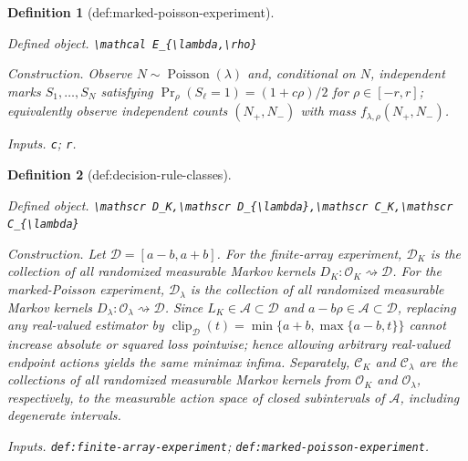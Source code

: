 \documentclass{article}
\newtheorem{definition}{Definition}
\begin{document}
\begin{definition}[def:marked-poisson-experiment]\label{def:marked-poisson-experiment}
\par\smallskip\noindent\emph{Defined object.} \texttt{\textbackslash{}\allowbreak{}mathcal E\_\allowbreak{}\{\textbackslash{}\allowbreak{}lambda,\allowbreak{}\textbackslash{}\allowbreak{}rho\}\allowbreak{}}
\par\smallskip\noindent\emph{Construction.} Observe \(N\sim\operatorname{Poisson}(\lambda)\) and, conditional on \(N\), independent marks \(S_1,\ldots,S_N\) satisfying \(\Pr_\rho(S_\ell=1)=(1+c\rho)/2\) for \(\rho\in[-r,r]\); equivalently observe independent counts \((N_+,N_-)\) with mass \(f_{\lambda,\rho}(N_+,N_-)\).
\par\smallskip\noindent\emph{Inputs.} \texttt{c}; \texttt{r}.
\end{definition}

\begin{definition}[def:decision-rule-classes]\label{def:decision-rule-classes}
\par\smallskip\noindent\emph{Defined object.} \texttt{\textbackslash{}\allowbreak{}mathscr D\_\allowbreak{}K,\allowbreak{}\textbackslash{}\allowbreak{}mathscr D\_\allowbreak{}\{\textbackslash{}\allowbreak{}lambda\}\allowbreak{},\allowbreak{}\textbackslash{}\allowbreak{}mathscr C\_\allowbreak{}K,\allowbreak{}\textbackslash{}\allowbreak{}mathscr C\_\allowbreak{}\{\textbackslash{}\allowbreak{}lambda\}\allowbreak{}}
\par\smallskip\noindent\emph{Construction.} Let \(\mathcal D=[a-b,a+b]\). For the finite-array experiment, \(\mathscr D_K\) is the collection of all randomized measurable Markov kernels \(D_K:\mathcal O_K\rightsquigarrow\mathcal D\). For the marked-Poisson experiment, \(\mathscr D_{\lambda}\) is the collection of all randomized measurable Markov kernels \(D_{\lambda}:\mathcal O_{\lambda}\rightsquigarrow\mathcal D\). Since \(L_K\in\mathcal A\subset\mathcal D\) and \(a-b\rho\in\mathcal A\subset\mathcal D\), replacing any real-valued estimator by \(\operatorname{clip}_{\mathcal D}(t)=\min\{a+b,\max\{a-b,t\}\}\) cannot increase absolute or squared loss pointwise; hence allowing arbitrary real-valued endpoint actions yields the same minimax infima. Separately, \(\mathscr C_K\) and \(\mathscr C_{\lambda}\) are the collections of all randomized measurable Markov kernels from \(\mathcal O_K\) and \(\mathcal O_{\lambda}\), respectively, to the measurable action space of closed subintervals of \(\mathcal A\), including degenerate intervals.
\par\smallskip\noindent\emph{Inputs.} \texttt{def:\allowbreak{}finite-\allowbreak{}array-\allowbreak{}experiment}; \texttt{def:\allowbreak{}marked-\allowbreak{}poisson-\allowbreak{}experiment}.
\end{definition}
\end{document}
